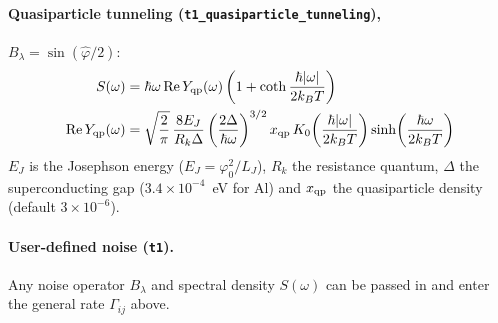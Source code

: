 \documentclass[11pt]{article}
\begin{document}
\paragraph{Quasiparticle tunneling (\texttt{t1\_quasiparticle\_tunneling}),}
$B_\lambda = \sin(\hat\varphi/2)$:
\begin{align}
  S(\omega) &= \hbar\omega\,\mathrm{Re}\,Y_{\rm qp}(\omega)\left(1 + \coth\frac{\hbar|\omega|}{2k_BT}\right) \\
  \mathrm{Re}\,Y_{\rm qp}(\omega) &= \sqrt{\frac{2}{\pi}}\,\frac{8E_J}{R_k\Delta}
    \left(\frac{2\Delta}{\hbar\omega}\right)^{3/2} x_{\rm qp}\,
    K_0\!\left(\frac{\hbar|\omega|}{2k_BT}\right)\sinh\!\left(\frac{\hbar\omega}{2k_BT}\right)
\end{align}
$E_J$ is the Josephson energy ($E_J = \varphi_0^2/L_J$), $R_k$ the resistance quantum, $\Delta$ the
superconducting gap ($3.4\times10^{-4}$~eV for Al) and $x_{\rm qp}$ the quasiparticle density
(default $3\times10^{-6}$).

\paragraph{User-defined noise (\texttt{t1}).} Any noise operator $B_\lambda$ and spectral density
$S(\omega)$ can be passed in and enter the general rate $\Gamma_{ij}$ above.

\end{document}
